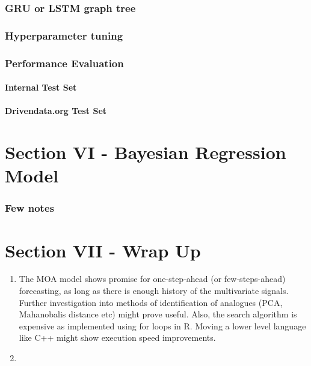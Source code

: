 \documentclass[floatsintext,man]{apa6}
\theoremstyle{definition}
\theoremstyle{definition}
\theoremstyle{definition}
\theoremstyle{remark}
\begin{document}
\subsubsection{GRU or LSTM graph tree}\label{gru-or-lstm-graph-tree}

\subsubsection{Hyperparameter tuning}\label{hyperparameter-tuning}

\subsubsection{Performance Evaluation}\label{performance-evaluation}

\paragraph{Internal Test Set}\label{internal-test-set-1}

\paragraph{Drivendata.org Test Set}\label{drivendata.org-test-set-1}

\section{Section VI - Bayesian Regression
Model}\label{section-vi---bayesian-regression-model}

\subsubsection{Few notes}\label{few-notes}

\section{Section VII - Wrap Up}\label{section-vii---wrap-up}

\begin{enumerate}
\def\labelenumi{\arabic{enumi}.}
\item
  The MOA model shows promise for one-step-ahead (or few-steps-ahead)
  forecasting, as long as there is enough history of the multivariate
  signals. Further investigation into methods of identification of
  analogues (PCA, Mahanobalis distance etc) might prove useful. Also,
  the search algorithm is expensive as implemented using for loops in R.
  Moving a lower level language like C++ might show execution speed
  improvements.
\item
\end{enumerate}
\end{document}
